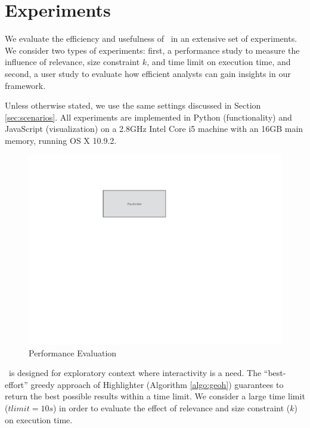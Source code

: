 \section{Experiments}
\label{sec:exp}
We evaluate the efficiency and usefulness of \framework\ in an extensive set of experiments. We consider two types of experiments: first, a performance study to measure the influence of relevance, size constraint $k$, and time limit on execution time, and second, a user study to evaluate how efficient analysts can gain insights in our framework.

\vspace{5pt}
 Unless otherwise stated, we use the same settings discussed in Section \ref{sec:scenarios}. All experiments are implemented in Python (functionality) and JavaScript (visualization) on a 2.8GHz Intel Core i5 machine with an 16GB main memory, running OS X 10.9.2.

\begin{figure}
  \centering
  \includegraphics[width=\columnwidth]{figs/placeholder}
\caption{Performance Evaluation}
\label{fig:performance}
\end{figure}

\vspace{5pt}
 \framework\ is designed for exploratory context where interactivity is a need. The ``best-effort'' greedy approach of {\sc Highlighter} (Algorithm \ref{algo:geoh}) guarantees to return the best possible results within a time limit. We consider a large time limit ($tlimit = 10s$) in order to evaluate the effect of relevance and size constraint ($k$) on execution time.

